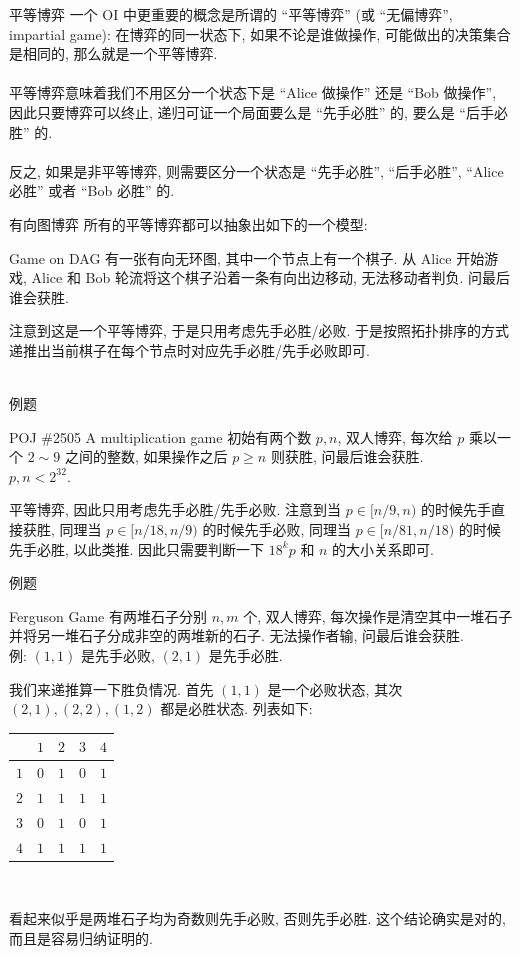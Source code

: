 \documentclass{beamer}
\newcommand{\nl}{\\\hspace*{\fill}\\}
\begin{document}
	\begin{frame}{平等博弈}
		一个 OI 中更重要的概念是所谓的 ``平等博弈'' (或 ``无偏博弈'', impartial game): 在博弈的同一状态下, 如果不论是谁做操作, 可能做出的决策集合是相同的, 那么就是一个平等博弈.\nl
		平等博弈意味着我们不用区分一个状态下是 ``Alice 做操作'' 还是 ``Bob 做操作'', 因此只要博弈可以终止, 递归可证一个局面要么是 ``先手必胜'' 的, 要么是 ``后手必胜'' 的.\nl
		反之, 如果是非平等博弈, 则需要区分一个状态是 ``先手必胜'', ``后手必胜'', ``Alice 必胜'' 或者 ``Bob 必胜'' 的.
	\end{frame}

	\begin{frame}{有向图博弈}
		所有的平等博弈都可以抽象出如下的一个模型:
		\begin{block}{Game on DAG}
			有一张有向无环图, 其中一个节点上有一个棋子. 从 Alice 开始游戏, Alice 和 Bob 轮流将这个棋子沿着一条有向出边移动, 无法移动者判负. 问最后谁会获胜.
		\end{block}
		注意到这是一个平等博弈, 于是只用考虑先手必胜/必败. 于是按照拓扑排序的方式递推出当前棋子在每个节点时对应先手必胜/先手必败即可.\nl
	\end{frame}

	\begin{frame}{例题}
		\begin{block}{POJ \#2505 A multiplication game}
			初始有两个数 $p,n$, 双人博弈, 每次给 $p$ 乘以一个 $2\sim 9$ 之间的整数, 如果操作之后 $p\geq n$ 则获胜, 问最后谁会获胜.\\
			$p,n<2^{32}$.
		\end{block}
		\pause
		平等博弈, 因此只用考虑先手必胜/先手必败. 注意到当 $p\in[n/9,n)$ 的时候先手直接获胜, 同理当 $p\in[n/18,n/9)$ 的时候先手必败, 同理当 $p\in[n/81,n/18)$ 的时候先手必胜, 以此类推. 因此只需要判断一下 $18^kp$ 和 $n$ 的大小关系即可.
	\end{frame}

	\begin{frame}{例题}
		\begin{block}{Ferguson Game}
			有两堆石子分别 $n,m$ 个, 双人博弈, 每次操作是清空其中一堆石子并将另一堆石子分成非空的两堆新的石子. 无法操作者输, 问最后谁会获胜.\\
			例: $(1,1)$ 是先手必败, $(2,1)$ 是先手必胜.
		\end{block}
		\pause
		我们来递推算一下胜负情况. 首先 $(1,1)$ 是一个必败状态, 其次 $(2,1),(2,2),(1,2)$ 都是必胜状态. 列表如下:\\
		\begin{center}
			\begin{tabular}{c|cccc}
				\toprule
				    & $1$ & $2$ & $3$ & $4$\\
				\hline
				$1$ & $0$ & $1$ & $0$ & $1$\\
				$2$ & $1$ & $1$ & $1$ & $1$\\
				$3$ & $0$ & $1$ & $0$ & $1$\\
				$4$ & $1$ & $1$ & $1$ & $1$\\
				\bottomrule
			\end{tabular}\\
		\end{center}
		看起来似乎是两堆石子均为奇数则先手必败, 否则先手必胜. 这个结论确实是对的, 而且是容易归纳证明的.
	\end{frame}
\end{document}
